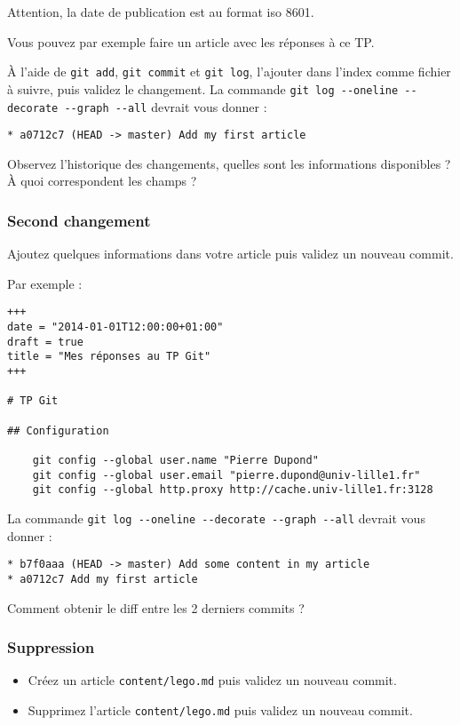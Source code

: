 \documentclass[a4paper]{article}
\begin{document}
Attention, la date de publication est au format iso 8601.

Vous pouvez par exemple faire un article avec les réponses à ce TP.

À l'aide de \verb|git add|, \verb|git commit| et \verb|git log|, l'ajouter dans l'index comme fichier à suivre, puis validez le changement. 
La commande \verb|git log --oneline --decorate --graph --all| devrait vous donner :
\begin{verbatim}
* a0712c7 (HEAD -> master) Add my first article
\end{verbatim}

Observez l'historique des changements, quelles sont les informations disponibles ? À quoi correspondent les champs ?

\subsubsection{Second changement}
Ajoutez quelques informations dans votre article puis validez un nouveau commit.

Par exemple : 
\begin{verbatim}
+++
date = "2014-01-01T12:00:00+01:00"
draft = true
title = "Mes réponses au TP Git"
+++

# TP Git

## Configuration

    git config --global user.name "Pierre Dupond"
    git config --global user.email "pierre.dupond@univ-lille1.fr"
    git config --global http.proxy http://cache.univ-lille1.fr:3128

\end{verbatim}

La commande \verb|git log --oneline --decorate --graph --all| devrait vous donner :
\begin{verbatim}
* b7f0aaa (HEAD -> master) Add some content in my article
* a0712c7 Add my first article
\end{verbatim}

Comment obtenir le diff entre les 2 derniers commits ?

\subsubsection{Suppression}
\begin{itemize}
\item Créez un article \verb|content/lego.md| puis validez un nouveau commit. 
\item Supprimez l'article \verb|content/lego.md| puis validez un nouveau commit. 
\end{itemize}
\end{document}
